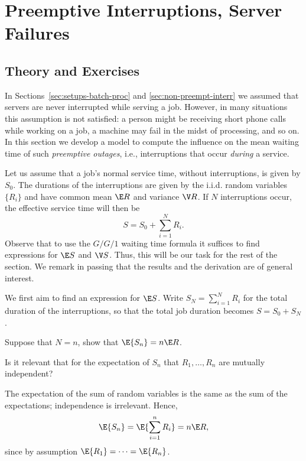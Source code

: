 \section{Preemptive Interruptions, Server Failures}
\label{sec:preempt-interr-serv}

\subsection*{Theory and Exercises}



In Sections~\ref{sec:setups-batch-proc} and \ref{sec:non-preempt-interr} we assumed that servers are never interrupted while serving a job.
However, in many situations this assumption is not satisfied: a person might be receiving short phone calls while working on a job, a machine may fail in the midst of processing, and so on.
In this section we develop a model to compute the influence on the mean waiting time of such \emph{preemptive outages}, i.e., interruptions that occur \emph{during} a service. 

Let us assume that a job's normal service time, without interruptions, is given by $S_0$. The durations of the interruptions are given by the i.i.d. random variables $\{R_i\}$ and have common mean $\E R$ and variance $\V R$. If $N$ interruptions occur, the effective service time will then be
\begin{equation*}
S= S_0 + \sum_{i=1}^N R_i.
\end{equation*}
Observe that to use the $G/G/1$ waiting time formula it suffices to find expressions for $\E S$ and $\V S$.
Thus, this will be our task for the rest of the section.
We remark in passing that the results and the derivation are of general interest.

We first aim to find an expression for $\E S$.  Write  $S_N = \sum_{i=1}^N R_i$ for the total duration of the interruptions, so that the total job duration becomes $S = S_0 + S_N$.

\begin{exercise}[\faFlask]
  Suppose that $N=n$, show that $\E{S_n}=n\E R$.
\begin{hint}
    Is it relevant that for the expectation of $S_n$ that $R_1,\ldots, R_n$ are mutually independent?
  \end{hint}
\begin{solution}
The expectation of the sum of random variables is the same as the sum of the expectations; independence is irrelevant. Hence,
\begin{equation*}
  \E{S_n } =  \E{\sum_{i=1}^n R_i}=  n \E R, 
\end{equation*}
since by assumption $\E{R_1} = \cdots = \E{R_n}$. 
\end{solution}
\end{exercise}

